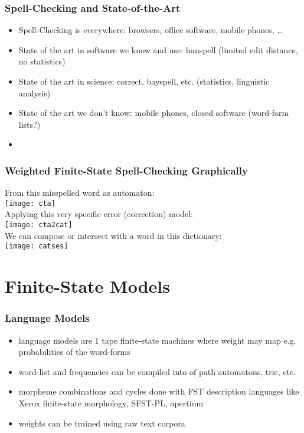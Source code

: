\documentclass[t,12pt]{beamer}
\begin{document}
\begin{frame}
    \frametitle{Spell-Checking and State-of-the-Art}
    \begin{itemize}
        \item Spell-Checking is everywhere: browsers, office software, mobile
            phones, \ldots
        \item State of the art in software we know and use: hunspell (limited
            edit distance, no statistics)
        \item State of the art in science: correct, bayspell, etc. (statistics,
            linguistic analysis)
        \item State of the art we don't know: mobile phones, closed software
            (word-form lists?)
        \item 
    \end{itemize}
\end{frame}

\begin{frame}
    \frametitle{Weighted Finite-State Spell-Checking Graphically}
    From this misspelled word as automaton:\\
    \texttt{[image: cta]}\\
    Applying this very specific error (correction) model:\\
\texttt{[image: cta2cat]}\\
    We can compose or intersect with a word in this dictionary:\\
\texttt{[image: catses]}\\
\end{frame}


\section{Finite-State Models}

\begin{frame}
    \frametitle{Language Models}
    \begin{itemize}
        \item language models are 1 tape finite-state machines where weight may
            map e.g. probabilities of the word-forms
        \item word-list and frequencies can be compiled into of path automatons,
            trie, etc.
        \item morpheme combinations and cycles done with FST description
            languages like Xerox finite-state morphology, SFST-PL, apertium
        \item weights can be trained using raw text corpora
    \end{itemize}
\end{frame}
\end{document}
